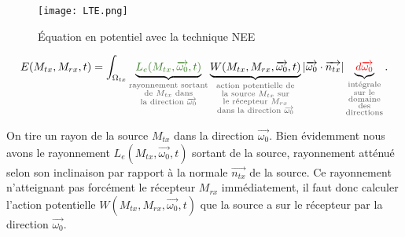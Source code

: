 \begin{figure}[h!]\label{fig:LTE_potentiel}
\centering
\texttt{[image: LTE.png]}
\caption{Équation en potentiel avec la technique NEE}
\end{figure}


\large
\begin{equation}
    E(M_{tx}, M_{rx}, t) = \int_{\Omega_{tx}}
        \underbrace{\textcolor{OliveGreen}{L_e(M_{tx}, \overrightarrow{\omega_0}, t)}}
            _{\textcolor{DarkGray}
             {\substack{\text{rayonnement sortant} \\
                        \text{de $M_{tx}$ dans} \\
                        \text{la direction $\overrightarrow{\omega_0}$}}}}
        \underbrace{W(M_{tx}, M_{rx}, \overrightarrow{\omega_0}, t)}
            _{\textcolor{DarkGray}
             {\substack{\text{action potentielle de} \\
                        \text{la source $M_{tx}$ sur} \\
                        \text{le récepteur $M_{rx}$} \\
                        \text{dans la direction $\overrightarrow{\omega_0}$}}}}
        | \overrightarrow{\omega_0} \cdot \overrightarrow{n_{tx}} |
        \underbrace{\textcolor{red}{d\overrightarrow{\omega_0}}}
            _{\textcolor{DarkGray}
             {\substack{\text{intégrale} \\
                        \text{sur le} \\
                        \text{domaine} \\
                        \text{des} \\
                        \text{directions}}}}
.\end{equation} \normalsize

On tire un rayon de la source $M_{tx}$ dans la direction $\overrightarrow{\omega_0}$. Bien évidemment nous avons le rayonnement $L_e(M_{tx}, \overrightarrow{\omega_0}, t)$ sortant de la source, rayonnement atténué selon son inclinaison par rapport à la normale $\overrightarrow{n_{tx}}$ de la source. Ce rayonnement n'atteignant pas forcément le récepteur $M_{rx}$ immédiatement, il faut donc calculer l'action potentielle $W(M_{tx}, M_{rx}, \overrightarrow{\omega_0}, t)$ que la source a sur le récepteur par la direction $\overrightarrow{\omega_0}$.

